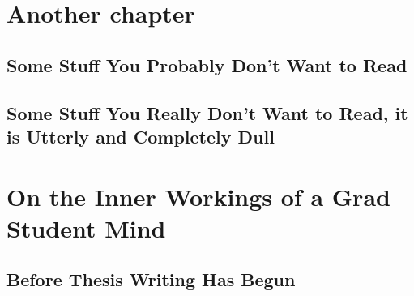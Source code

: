\documentclass[12pt,chapterheads]{ucsd}
\begin{document}
\chapter{Another chapter}
\section{Some Stuff You Probably Don't Want to Read}
\section{Some Stuff You Really Don't Want to Read, it is Utterly and Completely Dull}


\chapter{On the Inner Workings of a Grad Student Mind}
\section{Before Thesis Writing Has Begun}
\end{document}
